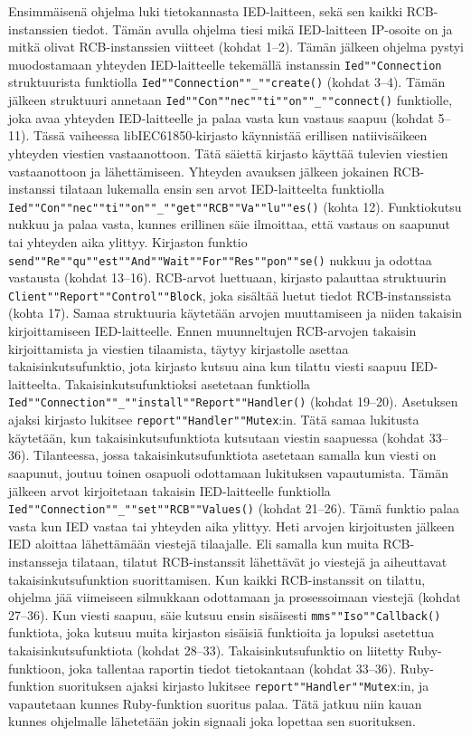Ensimmäisenä ohjelma luki tietokannasta IED-laitteen, sekä sen kaikki RCB-instanssien tiedot. Tämän avulla ohjelma tiesi mikä IED-laitteen IP-osoite on ja mitkä olivat RCB-instanssien viitteet (kohdat 1--2). Tämän jälkeen ohjelma pystyi muodostamaan yhteyden IED-laitteelle tekemällä instanssin \texttt{Ied""Connection} struktuurista funktiolla \texttt{Ied""Connection""\_""create()} (kohdat 3--4). Tämän jälkeen struktuuri annetaan \texttt{Ied""Con""nec""ti""on""\_""connect()} funktiolle, joka avaa yhteyden IED-laitteelle ja palaa vasta kun vastaus saapuu (kohdat 5--11). Tässä vaiheessa libIEC61850-kirjasto käynnistää erillisen natiivisäikeen yhteyden viestien vastaanottoon. Tätä säiettä kirjasto käyttää tulevien viestien vastaanottoon ja lähettämiseen. Yhteyden avauksen jälkeen jokainen RCB-instanssi tilataan lukemalla ensin sen arvot IED-laitteelta funktiolla \texttt{Ied""Con""nec""ti""on""\_""get""RCB""Va""lu""es()} (kohta 12). Funktiokutsu nukkuu ja palaa vasta, kunnes erillinen säie ilmoittaa, että vastaus on saapunut tai yhteyden aika ylittyy. Kirjaston funktio  \texttt{send""Re""qu""est""And""Wait""For""Res""pon""se()} nukkuu ja odottaa vastausta (kohdat 13--16). RCB-arvot luettuaan, kirjasto palauttaa struktuurin \texttt{Client""Report""Control""Block}, joka sisältää luetut tiedot RCB-instanssista (kohta 17). Samaa struktuuria käytetään arvojen muuttamiseen ja niiden takaisin kirjoittamiseen IED-laitteelle. Ennen muunneltujen RCB-arvojen takaisin kirjoittamista ja viestien tilaamista, täytyy kirjastolle asettaa takaisinkutsufunktio, jota kirjasto kutsuu aina kun tilattu viesti saapuu IED-laitteelta. Takaisinkutsufunktioksi asetetaan funktiolla \texttt{Ied""Connection""\_""install""Report""Handler()} (kohdat 19--20). Asetuksen ajaksi kirjasto lukitsee \texttt{report""Handler""Mutex}:in. Tätä samaa lukitusta käytetään, kun takaisinkutsufunktiota kutsutaan viestin saapuessa (kohdat 33--36). Tilanteessa, jossa takaisinkutsufunktiota asetetaan samalla kun viesti on saapunut, joutuu toinen osapuoli odottamaan lukituksen vapautumista. Tämän jälkeen arvot kirjoitetaan takaisin IED-laitteelle funktiolla \texttt{Ied""Connection""\_""set""RCB""Values()} (kohdat 21--26). Tämä funktio palaa vasta kun IED vastaa tai yhteyden aika ylittyy. Heti arvojen kirjoitusten jälkeen IED aloittaa lähettämään viestejä tilaajalle. Eli samalla kun muita RCB-instansseja tilataan, tilatut RCB-instanssit lähettävät jo viestejä ja aiheuttavat takaisinkutsufunktion suorittamisen. Kun kaikki RCB-instanssit on tilattu, ohjelma jää viimeiseen silmukkaan odottamaan ja prosessoimaan viestejä (kohdat 27--36). Kun viesti saapuu, säie kutsuu ensin sisäisesti \texttt{mms""Iso""Callback()} funktiota, joka kutsuu muita kirjaston sisäisiä funktioita ja lopuksi asetettua takaisinkutsufunktiota (kohdat 28--33). Takaisinkutsufunktio on liitetty Ruby-funktioon, joka tallentaa raportin tiedot tietokantaan (kohdat 33--36). Ruby-funktion suorituksen ajaksi kirjasto lukitsee \texttt{report""Handler""Mutex}:in, ja vapautetaan kunnes Ruby-funktion suoritus palaa. Tätä jatkuu niin kauan kunnes ohjelmalle lähetetään jokin signaali joka lopettaa sen suorituksen. \mbox{\cite{libIEC61850-repo}}



